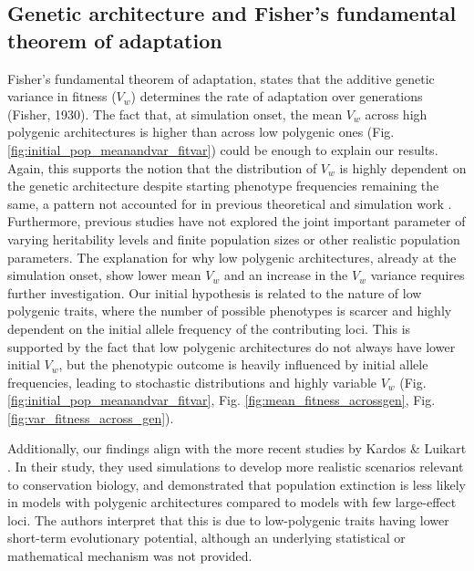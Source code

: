 \documentclass{article}
\begin{document}
\subsection{Genetic architecture and Fisher's fundamental theorem of adaptation}
Fisher's fundamental theorem of adaptation, states that the additive genetic variance in fitness ($V_w$) determines the rate of adaptation over generations (Fisher, 1930). The fact that, at simulation onset, the mean $V_w$ across high polygenic architectures is higher than across low polygenic ones (Fig. \ref{fig:initial_pop_meanandvar_fitvar}) could be enough to explain our results. Again, this supports the notion that the distribution of $V_w$ is highly dependent on the genetic architecture despite starting phenotype frequencies remaining the same, a pattern not accounted for in previous theoretical and simulation work \citep{De_Vladar2014-xp, Orr2014-yn, Stephan2016-tx, Jain2017-mb, Stetter2018-st, Hollinger2019-lb,Thornton2019-ww, John2020-xc}. Furthermore, previous studies have not explored the joint important parameter of varying heritability levels and finite population sizes or other realistic population parameters. The explanation for why low polygenic architectures, already at the simulation onset, show lower mean $V_w$ and an increase in the $V_w$ variance requires further investigation. Our initial hypothesis is related to the nature of low polygenic traits, where the number of possible phenotypes is scarcer and highly dependent on the initial allele frequency of the contributing loci. This is supported by the fact that low polygenic architectures do not always have lower initial $V_w$, but the phenotypic outcome is heavily influenced by initial allele frequencies, leading to stochastic distributions and highly variable $V_w$ (Fig. \ref{fig:initial_pop_meanandvar_fitvar}, Fig. \ref{fig:mean_fitness_acrossgen}, Fig. \ref{fig:var_fitness_across_gen}).

Additionally, our findings align with the more recent studies by Kardos \& Luikart \citep{Kardos2021-jd}. In their study, they used simulations to develop more realistic scenarios relevant to conservation biology, and demonstrated that population extinction is less likely in models with polygenic architectures compared to models with few large-effect loci. The authors interpret that this is due to low-polygenic traits having lower short-term evolutionary potential, although an underlying statistical or mathematical mechanism was not provided.
\end{document}
